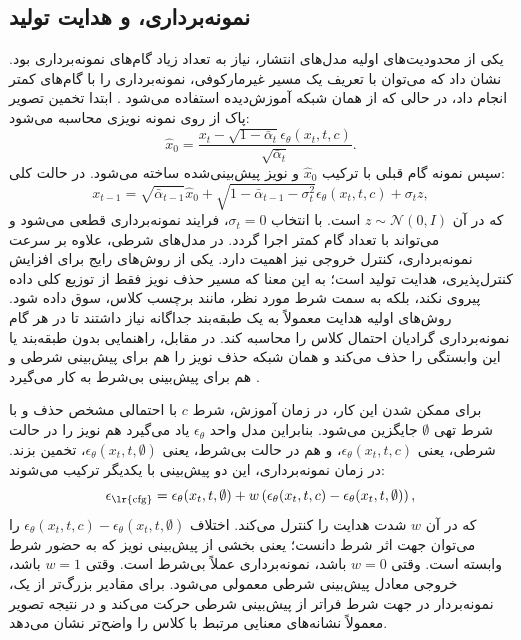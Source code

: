 \subsection{نمونه‌برداری،  و هدایت تولید}
یکی از محدودیت‌های اولیه مدل‌های انتشار، نیاز به تعداد زیاد گام‌های نمونه‌برداری بود.  نشان داد که می‌توان با تعریف یک مسیر غیرمارکوفی، نمونه‌برداری را با گام‌های کمتر انجام داد، در حالی که از همان شبکه آموزش‌دیده استفاده می‌شود \cite{song2021ddim}. ابتدا تخمین تصویر پاک از روی نمونه نویزی محاسبه می‌شود:
\begin{equation}
\hat{x}_0 =
\frac{x_t - \sqrt{1-\bar{\alpha}_t}\epsilon_\theta(x_t,t,c)}
{\sqrt{\bar{\alpha}_t}}.
\end{equation}
سپس نمونه گام قبلی با ترکیب $\hat{x}_0$ و نویز پیش‌بینی‌شده ساخته می‌شود. در حالت کلی:
\begin{equation}
x_{t-1} =
\sqrt{\bar{\alpha}_{t-1}}\hat{x}_0
+ \sqrt{1-\bar{\alpha}_{t-1}-\sigma_t^2}\epsilon_\theta(x_t,t,c)
+ \sigma_t z,
\end{equation}
که در آن $z \sim \mathcal{N}(0,I)$ است. با انتخاب $\sigma_t=0$، فرایند نمونه‌برداری قطعی می‌شود و می‌تواند با تعداد گام کمتر اجرا گردد. در مدل‌های شرطی، علاوه بر سرعت نمونه‌برداری، کنترل خروجی نیز اهمیت دارد. یکی از روش‌های رایج برای افزایش کنترل‌پذیری، هدایت تولید است؛ به این معنا که مسیر حذف نویز فقط از توزیع کلی داده پیروی نکند، بلکه به سمت شرط مورد نظر، مانند برچسب کلاس، سوق داده شود. روش‌های اولیه هدایت معمولاً به یک طبقه‌بند جداگانه نیاز داشتند تا در هر گام نمونه‌برداری گرادیان احتمال کلاس را محاسبه کند. در مقابل، راهنمایی بدون طبقه‌بند یا  این وابستگی را حذف می‌کند و همان شبکه حذف نویز را هم برای پیش‌بینی شرطی و هم برای پیش‌بینی بی‌شرط به کار می‌گیرد \cite{ho2022classifierFreeGuidance}.

برای ممکن شدن این کار، در زمان آموزش، شرط $c$ با احتمالی مشخص حذف و با شرط تهی $\emptyset$ جایگزین می‌شود. بنابراین مدل واحد $\epsilon_\theta$ یاد می‌گیرد هم نویز را در حالت شرطی، یعنی $\epsilon_\theta(x_t,t,c)$، و هم در حالت بی‌شرط، یعنی $\epsilon_\theta(x_t,t,\emptyset)$، تخمین بزند. در زمان نمونه‌برداری، این دو پیش‌بینی با یکدیگر ترکیب می‌شوند:
\begin{equation}
\epsilon_{\text{\lr{cfg}}} =
\epsilon_\theta(x_t,t,\emptyset)
+ w\left(
\epsilon_\theta(x_t,t,c) -
\epsilon_\theta(x_t,t,\emptyset)
\right),
\end{equation}
که در آن $w$ شدت هدایت را کنترل می‌کند. اختلاف
$\epsilon_\theta(x_t,t,c)-\epsilon_\theta(x_t,t,\emptyset)$
را می‌توان جهت اثر شرط دانست؛ یعنی بخشی از پیش‌بینی نویز که به حضور شرط وابسته است. وقتی $w=0$ باشد، نمونه‌برداری عملاً بی‌شرط است. وقتی $w=1$ باشد، خروجی معادل پیش‌بینی شرطی معمولی می‌شود. برای مقادیر بزرگ‌تر از یک، نمونه‌بردار در جهت شرط فراتر از پیش‌بینی شرطی حرکت می‌کند و در نتیجه تصویر معمولاً نشانه‌های معنایی مرتبط با کلاس را واضح‌تر نشان می‌دهد.

